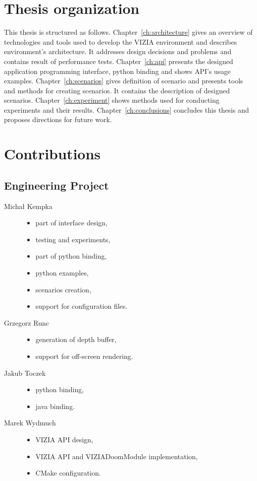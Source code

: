 \section{Thesis organization}


This thesis is structured as follows. 
Chapter~\ref{ch:architecture} gives an overview of technologies and tools used to develop the VIZIA environment and describes environment's architecture. It addresses design decisions and problems and contains result of performance tests. 
Chapter~\ref{ch:api} presents the designed application programming interface, python binding and shows API's usage examples. 
Chapter~\ref{ch:scenarios} gives definition of scenario and presents tools and methods for creating scenarios. It contains the description of designed scenarios. 
Chapter~\ref{ch:experiment} shows methods used for conducting experiments and their results. 
Chapter~\ref{ch:conclusions} concludes this thesis and proposes directions for future work.

\section{Contributions}
	\subsection{Engineering Project}
	\begin{description}
		\item[Michał Kempka] \hfill
			\begin{itemize}
				\item part of interface design,
				\item testing and experiments,
				\item part of python binding,
				\item python examples,
				\item scenarios creation,
				\item support for configuration files.
			\end{itemize}
		\item[Grzegorz Runc] \hfill
			\begin{itemize}
				\item generation of depth buffer,
				\item support for off-screen rendering.
			\end{itemize}
		\item[Jakub Toczek] \hfill
			\begin{itemize}
				\item python binding,
				\item java binding.
			\end{itemize}
		\item[Marek Wydmuch] \hfill
			\begin{itemize}
				\item VIZIA API design,
				\item VIZIA API and VIZIADoomModule implementation,
				\item CMake configuration.
			\end{itemize}
	\end{description}
	
